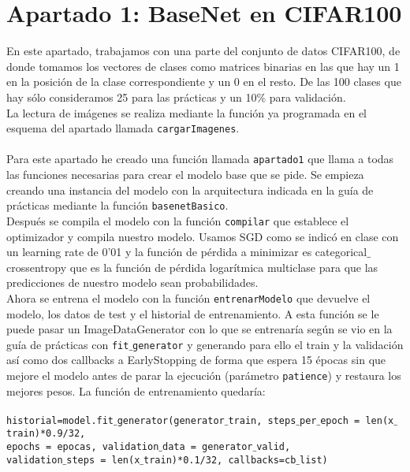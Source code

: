 \documentclass[12pt]{article}
\begin{document}
\section*{Apartado 1: BaseNet en CIFAR100}
En este apartado, trabajamos con una parte del conjunto de datos CIFAR100, de donde tomamos los vectores de clases como matrices binarias en las que hay un 1 en la posición de la clase correspondiente y un 0 en el resto. De las 100 clases que hay sólo consideramos 25 para las prácticas y un 10$\%$ para validación.\\
La lectura de imágenes se realiza mediante la función ya programada en el esquema del apartado llamada \texttt{cargarImagenes}.\\\\
Para este apartado he creado una función llamada \texttt{apartado1} que llama a todas las funciones necesarias para crear el modelo base que se pide. Se empieza creando una instancia del modelo con la arquitectura indicada en la guía de prácticas mediante la función \texttt{basenetBasico}.\\
Después se compila el modelo con la función \texttt{compilar} que establece el optimizador y compila nuestro modelo. Usamos SGD como se indicó en clase con un learning rate de 0'01 y la función de pérdida a minimizar es categorical$\_$crossentropy que es la función de pérdida logarítmica multiclase para que las predicciones de nuestro modelo sean probabilidades.\\
Ahora se entrena el modelo con la función \texttt{entrenarModelo} que devuelve el modelo, los datos de test y el historial de entrenamiento. A esta función se le puede pasar un ImageDataGenerator con lo que se entrenaría según se vio en la guía de prácticas con \texttt{fit$\_$generator} y generando para ello el train y la validación así como dos callbacks a EarlyStopping de forma que espera 15 épocas sin que mejore el modelo antes de parar la ejecución (parámetro \texttt{patience}) y restaura los mejores pesos. La función de entrenamiento quedaría:\\\\
\texttt{historial=model.fit$\_$generator(generator$\_$train,
                            steps$\_$per$\_$epoch = len(x$\_$train)*0.9/32,\\
                            epochs = epocas, 
                            validation$\_$data = generator$\_$valid, \\
                            validation$\_$steps = len(x$\_$train)*0.1/32,
                            callbacks=cb$\_$list)}\\\\
\end{document}
